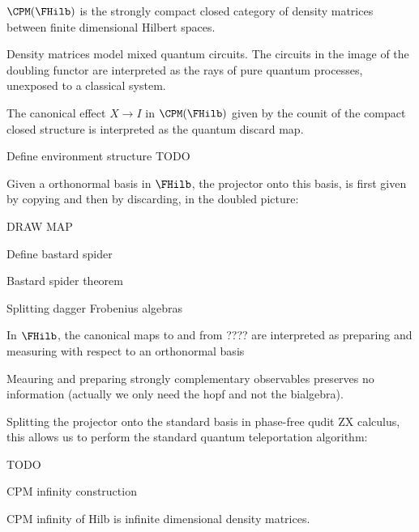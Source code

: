\begin{example}
$\CPM(\FHilb)$ is the strongly compact closed category of density matrices between finite dimensional Hilbert spaces.

Density matrices model mixed quantum circuits.  The circuits in the image of the doubling functor are interpreted as the rays of pure quantum processes, unexposed to a classical system.

The canonical effect $X\to I$ in $\CPM(\FHilb)$ given by the counit of the compact closed structure is interpreted as the quantum discard map.
\end{example}


\begin{definition}
Define environment structure TODO
\end{definition}




\begin{definition}
Given a orthonormal basis in $\FHilb$, the projector onto this basis, is first given by copying and then by discarding, in the doubled picture:

DRAW MAP
\end{definition}



\begin{definition}
Define bastard spider
\end{definition}



\begin{lemma}
Bastard spider theorem
\end{lemma}

\begin{definition}
Splitting dagger Frobenius algebras
\end{definition}

\begin{lemma}
In $\FHilb$, the canonical maps to and from ???? are interpreted as preparing and measuring with respect to an orthonormal basis
\end{lemma}


\begin{remark}
Meauring and preparing strongly complementary observables preserves no information (actually we only need the hopf and not the bialgebra).
\end{remark}


\begin{example}
Splitting the projector onto the standard basis in phase-free qudit ZX calculus, this allows us to perform the standard quantum teleportation algorithm:


TODO
\end{example}

\begin{definition}
CPM infinity construction
\end{definition}

\begin{lemma}
CPM infinity of Hilb is infinite dimensional density matrices.
\end{lemma}





